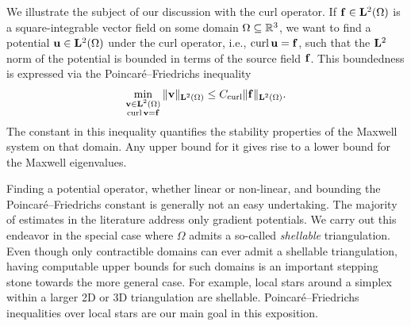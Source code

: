 \documentclass[12pt,a4paper]{article}
\begin{document}

We illustrate the subject of our discussion with the curl operator. 
If ${\mathbf f} \in {\mathbf L}^{2}(\Omega)$ is a square-integrable vector field on some domain $\Omega \subseteq {\mathbb R}^3$, 
we want to find a potential ${\mathbf u} \in {\mathbf L}^2(\Omega)$ under the curl operator, i.e., $\operatorname{curl} {\mathbf u} = {\mathbf f}$, such that the ${\mathbf L}^2$ norm of the potential is bounded in terms of the source field ${\mathbf f}$. 
This boundedness is expressed via the Poincar\'e--Friedrichs inequality 
\begin{align*}
    \min\limits_{ \substack{ {\mathbf v} \in {\mathbf L}^{2}(\Omega) \\ \operatorname{curl} {\mathbf v} = {\mathbf f} } } \| {\mathbf v} \|_{{\mathbf L}^{2}(\Omega)}
    \leq 
    C_{\operatorname{curl}}
    \| {\mathbf f} \|_{{\mathbf L}^{2}(\Omega)}
    .
\end{align*}
The constant in this inequality quantifies the stability properties of the Maxwell system on that domain. Any upper bound for it gives rise to a lower bound for the Maxwell eigenvalues.

Finding a potential operator, whether linear or non-linear, and bounding the Poincar\'e--Friedrichs constant is generally not an easy undertaking. 
The majority of estimates in the literature address only gradient potentials. 
We carry out this endeavor in the special case where $\Omega$ admits a so-called \emph{shellable} triangulation. 
Even though only contractible domains can ever admit a shellable triangulation, 
having computable upper bounds for such domains is an important stepping stone towards the more general case. 
For example, local stars around a simplex within a larger 2D or 3D triangulation are shellable.
Poincar\'e--Friedrichs inequalities over local stars are our main goal in this exposition. 
\\
\end{document}
